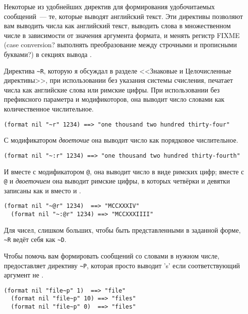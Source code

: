 Некоторые из удобнейших директив  для формирования удобочитаемых
сообщений~--- те, которые выводят английский текст. Эти директивы позволяют вам выводить
числа как английский текст, выводить слова в множественном числе в зависимости от значения
аргумента формата, и менять регистр FIXME (case conversion?  выполнять преобразование
между строчными и прописными буквами?) в секциях вывода .

Директива \lstinline!~R!, которую я обсуждал в разделе <<Знаковые и Целочисленные
директивы>>, при использовании без указания системы счисления, печатает числа как
английские слова или римские цифры. При использовании без префиксного параметра и
модификоторов, она выводит число словами как количественное числительное.

\begin{lstlisting}[style=lisprepl]
  (format nil "~r" 1234) ==> "one thousand two hundred thirty-four"
\end{lstlisting}

С модификатором \textit{двоеточие} она выводит число как порядковое числительное.

\begin{lstlisting}[style=lisprepl]
  (format nil "~:r" 1234) ==> "one thousand two hundred thirty-fourth"
\end{lstlisting}

И вместе с модификатором \lstinline!@!, она выводит число в виде римских цифр; вместе с
\lstinline!@! и \textit{двоеточием} она выводит римские цифры, в которых четвёрки и
девятки записаны как  и  вместо  и .

\begin{lstlisting}[style=lisprepl]
  (format nil "~@r" 1234)  ==> "MCCXXXIV"
  (format nil "~:@r" 1234) ==> "MCCXXXIIII"
\end{lstlisting}

Для чисел, слишком больших, чтобы быть представленными в заданной форме, \lstinline!~R!
ведёт себя как \lstinline!~D!.

Чтобы помочь вам формировать сообщений со словами в нужном числе, 
предоставляет директиву \lstinline!~P!, которая просто выводит 's' если соответствующий
аргумент не .

\begin{lstlisting}[style=lisprepl]
  (format nil "file~p" 1)  ==> "file"
  (format nil "file~p" 10) ==> "files"
  (format nil "file~p" 0)  ==> "files"
\end{lstlisting}

